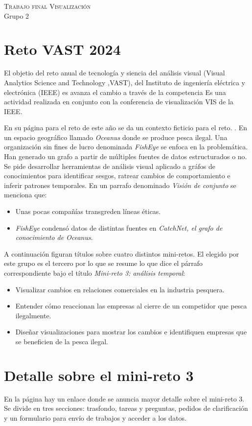 \documentclass[11pt,spanish,a4paper]{article}
\begin{document}
\begin{center}
  \textsc{\large Trabajo final Visualización}\\
	Grupo 2
\end{center}

\section{Reto VAST 2024}
El objetio del reto anual de tecnología y siencia del análisis visual (Visual Analytics Science and Technology ,VAST), del Instituto de ingeniería eléctrica y electrónica (IEEE) es avanza el cambio a través de la competencia 
Es una actividad realizada en conjunto con la conferencia de visualización VIS de la IEEE.

En su página para el reto de este año se da un contexto ficticio para el reto.
 \cite{noauthor_vast_nodate}.
En un espacio geográfico llamado \emph{Oceanus} donde se produce pesca ilegal.
Una organización sin fines de lucro denominada \emph{FishEye} se enfoca en la problemática.
Han generado un grafo a partir de múltiples fuentes de datos estructurados o no.
Se pide desarrollar herramientas de análisis visual aplicado a gráfos de conocimientos para identificar sesgos, ratrear cambios de comportamiento e inferir patrones temporales.
En un parrafo denominado \emph{Visión de conjunto} se menciona que:
\begin{itemize}
	\item Unas pocas compañías transgreden líneas éticas.
	\item \emph{FishEye} condensó datos de distintas fuentes en \emph{CatchNet, el grafo de conocimiento de Oceanus}.
\end{itemize}

A continuación figuran títulos sobre cuatro distintos mini-retos.
El elegido por este grupo es el tercero por lo que se resume lo que dice el párrafo correspondiente bajo el título \emph{Mini-reto 3: análisis temporal}:
\begin{itemize}
	\item Visualizar cambios en relaciones comerciales en la industria pesquera.
	\item Entender cómo reaccionan las empresas al cierre de un competidor que pesca ilegalmente.
	\item Diseñar visualizaciones para mostrar los cambios e identifiquen empresas que se beneficien de la pesca ilegal.
\end{itemize}


\section{Detalle sobre el mini-reto 3}
En la página hay un enlace donde se anuncia mayor detalle sobre el mini-reto 3.
Se divide en tres secciones: trasfondo, tareas y preguntas, pedidos de clarificación y un formulario para envío de trabajos y acceder a los datos.
\end{document}
